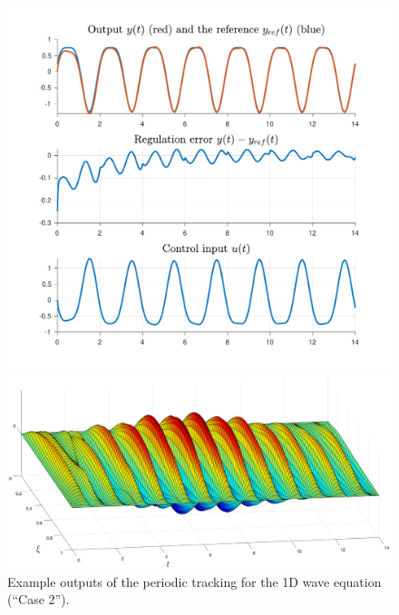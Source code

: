 \documentclass[11pt, a4paper]{amsart}
\theoremstyle{definition}
\numberwithin{equation}{section}
\begin{document}
\begin{figure}[h!]
  \centering
  \begin{minipage}{0.43\linewidth}
    \begin{flushleft}
      \includegraphics[width=0.95\linewidth]{W1D2outputs.pdf}
    \end{flushleft}
  \end{minipage}
  \begin{minipage}{0.55\linewidth}
    \begin{flushright}
      \includegraphics[width=\linewidth]{W1D2profile.png}
    \end{flushright}
  \end{minipage}

    \caption{Example outputs of the periodic tracking for the 1D wave equation (``Case 2'').}
  \label{fig:1Dwave1}
\end{figure}
\end{document}
